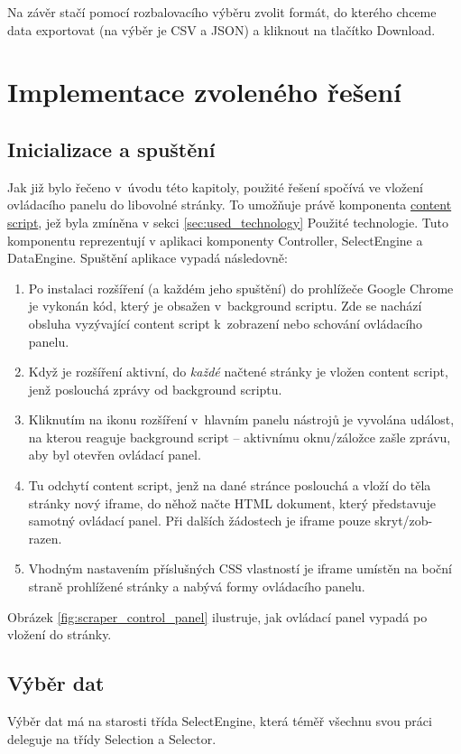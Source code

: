 \documentclass[thesis=B,czech]{FITthesis}[2012/06/26]
\begin{document}
Na závěr stačí pomocí rozbalovacího výběru zvolit formát, do kterého chceme data exportovat (na výběr je CSV a JSON) a kliknout na tlačítko \textsf{Download}.


\section{Implementace zvoleného řešení}

\subsection{Inicializace a spuštění}
Jak již bylo řečeno v~úvodu této kapitoly, použité řešení spočívá ve vložení ovládacího panelu do libovolné stránky. To umožňuje právě komponenta \hyperref[def:content_script]{content script}, jež byla zmíněna v sekci \ref{sec:used_technology} Použité technologie. Tuto komponentu reprezentují v aplikaci komponenty Controller, SelectEngine a DataEngine. Spuštění aplikace vypadá následovně:
\begin{enumerate}
	\item Po instalaci rozšíření (a každém jeho spuštění) do prohlížeče Google Chrome je vykonán kód, který je obsažen v~background scriptu. Zde se nachází obsluha vyzývající content script k~zobrazení nebo schování ovládacího panelu.
	\item Když je rozšíření aktivní, do \emph{každé} načtené stránky je vložen content script, jenž poslouchá zprávy od background scriptu.
	\item Kliknutím na ikonu rozšíření v~hlavním panelu nástrojů je vyvolána událost, na kterou reaguje background script -- aktivnímu oknu/záložce zašle zprávu, aby byl otevřen ovládací panel. 
	\item Tu odchytí content script, jenž na dané stránce poslouchá a vloží do těla stránky nový iframe, do něhož načte HTML dokument, který představuje samotný ovládací panel. Při dalších žádostech je iframe pouze skryt/zob-razen.
	\item Vhodným nastavením příslušných CSS vlastností je iframe umístěn na boční straně prohlížené stránky a nabývá formy ovládacího panelu. 
\end{enumerate}
Obrázek \ref{fig:scraper_control_panel} ilustruje, jak ovládací panel vypadá po vložení do stránky.

\subsection{Výběr dat}
\label{sec:data_selection}
Výběr dat má na starosti třída SelectEngine, která téměř všechnu svou práci deleguje na třídy Selection a Selector. 
\end{document}

